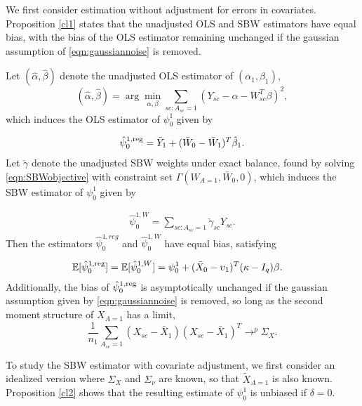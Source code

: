 We first consider estimation without adjustment for errors in covariates. 
Proposition \ref{cl1} states that the unadjusted OLS and SBW estimators have equal bias, with the bias of the OLS estimator remaining unchanged if the gaussian assumption of \eqref{eqn:gaussiannoise} is removed.
\begin{proposition}\label{cl1}
Let $(\hat{\alpha}, \hat{\beta})$ denote the unadjusted OLS estimator of $(\alpha_1, \beta_1)$, 
\begin{equation}\label{eqn:prop1.beta}
(\hat{\alpha}, \hat{\beta}) = \arg \min_{\alpha, \beta} \sum_{sc:A_{sc}=1} (Y_{sc} - \alpha -  W_{sc}^T\beta)^2,
\end{equation}
which induces the OLS estimator of $\psi_0^1$ given by

\begin{align*}
\hat{\psi}^{1,\textup{reg}}_0 = \bar{Y}_1 + (\bar{W}_0 - \bar{W}_1)^T\hat{\beta}_1.
\end{align*}
%
Let $\check{\gamma}$ denote the unadjusted SBW weights under exact balance, found by solving \eqref{eqn:SBWobjective} with constraint set $\Gamma( W_{A=1}, \bar{W}_0, 0)$, which induces the SBW estimator of $\psi_0^1$ given by

\begin{align*}
\hat{\psi}^{1,W}_0 = \sum_{sc: A_{sc} = 1} \check{\gamma}_{sc} Y_{sc}.
\end{align*}
%
Then the estimators $\hat{\psi}^{1, reg}_0$ and $\hat{\psi}^{1, W}_0$ have equal bias, satisfying

\begin{align*}
\mathbb{E}[\hat{\psi}_0^{1,\textup{reg}}] &= \mathbb{E}[\hat{\psi}^{1, W}_0]  = \psi_0^1 + (\bar{X}_0 - \upsilon_1)^T(\mathbf{\kappa} - I_q)\beta.
\end{align*}
Additionally, the bias of $\hat{\psi}_0^{1,\textup{reg}}$ is asymptotically unchanged if the gaussian assumption given by \eqref{eqn:gaussiannoise} is removed, so long as the second moment structure of $X_{A=1}$ has a limit,
\begin{equation}\label{eqn:prop1.assumption}
 \frac{1}{n_1} \sum_{A_{sc}=1} (X_{sc} - \bar{X}_1)(X_{sc} - \bar{X}_1)^T \rightarrow^p \Sigma_X.
 \end{equation}
\end{proposition}

To study the SBW estimator with covariate adjustment, we first consider an idealized version where $\Sigma_X$ and $\Sigma_\nu$ are known, so that $\tilde{X}_{A=1}$ is also known. Proposition \ref{cl2} shows that the resulting estimate of $\psi_0^1$ is unbiased if $\delta = 0$.

